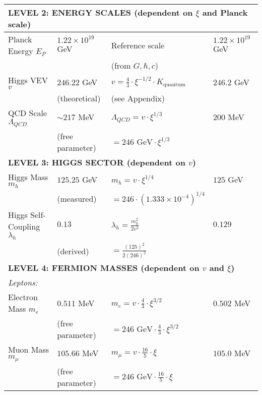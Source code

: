 \documentclass[12pt,a4paper]{article}
\begin{document}
\begin{longtable}{p{4.5cm}p{3.5cm}p{3.5cm}p{3.5cm}}
		\midrule
		\multicolumn{4}{l}{\textbf{LEVEL 2: ENERGY SCALES (dependent on $\xi$ and Planck scale)}} \\
		\midrule
		
		Planck Energy $E_P$ & $1.22 \times 10^{19}$ GeV & Reference scale & $1.22 \times 10^{19}$ GeV \\
		& & (from $G, \hbar, c$) & \\[0.3em]
		
		Higgs VEV $v$ & $246.22$ GeV & $v = \frac{4}{3} \cdot \xi^{-1/2} \cdot K_{\text{quantum}}$ & $246.2$ GeV \\
		& (theoretical) & (see Appendix) & \\[0.3em]
		
		QCD Scale $\Lambda_{QCD}$ & $\sim 217$ MeV & $\Lambda_{QCD} = v \cdot \xi^{1/3}$ & $200$ MeV \\
		& (free parameter) & $= 246 \text{ GeV} \cdot \xi^{1/3}$ & \\[0.3em]
		
		\midrule
		\multicolumn{4}{l}{\textbf{LEVEL 3: HIGGS SECTOR (dependent on $v$)}} \\
		\midrule
		
		Higgs Mass $m_h$ & $125.25$ GeV & $m_h = v \cdot \xi^{1/4}$ & $125$ GeV \\
		& (measured) & $= 246 \cdot (1.333 \times 10^{-4})^{1/4}$ & \\[0.3em]
		
		Higgs Self-Coupling $\lambda_h$ & $0.13$ & $\lambda_h = \frac{m_h^2}{2v^2}$ & $0.129$ \\
		& (derived) & $= \frac{(125)^2}{2(246)^2}$ & \\[0.3em]
		
		\midrule
		\multicolumn{4}{l}{\textbf{LEVEL 4: FERMION MASSES (dependent on $v$ and $\xi$)}} \\
		\midrule
		
		\multicolumn{4}{l}{\textit{Leptons:}} \\
		
		Electron Mass $m_e$ & $0.511$ MeV & $m_e = v \cdot \frac{4}{3} \cdot \xi^{3/2}$ & $0.502$ MeV \\
		& (free parameter) & $= 246 \text{ GeV} \cdot \frac{4}{3} \cdot \xi^{3/2}$ & \\[0.3em]
		
		Muon Mass $m_\mu$ & $105.66$ MeV & $m_\mu = v \cdot \frac{16}{5} \cdot \xi$ & $105.0$ MeV \\
		& (free parameter) & $= 246 \text{ GeV} \cdot \frac{16}{5} \cdot \xi$ & \\[0.3em]
		

\end{longtable}
\end{document}

